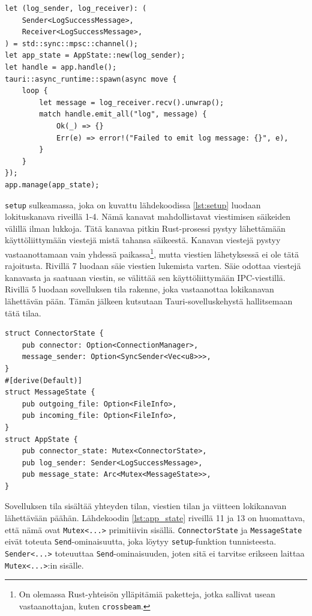 \documentclass[a4paper,12pt]{article}
\begin{document}
    \begin{lstlisting}[caption={setup-sulkeuma}, label={lst:setup}]
let (log_sender, log_receiver): (
    Sender<LogSuccessMessage>,
    Receiver<LogSuccessMessage>,
) = std::sync::mpsc::channel();
let app_state = AppState::new(log_sender);
let handle = app.handle();
tauri::async_runtime::spawn(async move {
    loop {
        let message = log_receiver.recv().unwrap();
        match handle.emit_all("log", message) {
            Ok(_) => {}
            Err(e) => error!("Failed to emit log message: {}", e),
        }
    }
});
app.manage(app_state);
\end{lstlisting}

    \lstinline{setup} sulkeamassa, joka on kuvattu lähdekoodissa \ref{lst:setup} luodaan lokituskanava riveillä 1-4. Nämä kanavat mahdollistavat viestimisen säikeiden välillä ilman lukkoja. Tätä kanavaa pitkin Rust-prosessi pystyy lähettämään käyttöliittymään viestejä mistä tahansa säikeestä. Kanavan viestejä pystyy vastaanottamaan vain yhdessä paikassa\footnote{On olemassa Rust-yhteisön ylläpitämiä paketteja, jotka sallivat usean vastaanottajan, kuten \lstinline{crossbeam}.}, mutta viestien lähetyksessä ei ole tätä rajoitusta\cite[ch. 16.2]{rust-book}. Rivillä 7 luodaan säie viestien lukemista varten. Säie odottaa viestejä kanavasta ja saatuaan viestin, se välittää sen käyttöliittymään IPC-viestillä. Rivillä 5 luodaan sovelluksen tila rakenne, joka vastaanottaa lokikanavan lähettävän pään. Tämän jälkeen kutsutaan Tauri-sovelluskehystä hallitsemaan tätä tilaa.

    \begin{lstlisting}[caption={Sovelluksen tilan rakenne}, label={lst:app_state}]
struct ConnectorState {
    pub connector: Option<ConnectionManager>,
    message_sender: Option<SyncSender<Vec<u8>>>,
}
#[derive(Default)]
struct MessageState {
    pub outgoing_file: Option<FileInfo>,
    pub incoming_file: Option<FileInfo>,
}
struct AppState {
    pub connector_state: Mutex<ConnectorState>,
    pub log_sender: Sender<LogSuccessMessage>,
    pub message_state: Arc<Mutex<MessageState>>,
}\end{lstlisting}

    Sovelluksen tila sisältää yhteyden tilan, viestien tilan ja viitteen lokikanavan lähettävään päähän. Lähdekoodin \ref{lst:app_state} riveillä 11 ja 13 on huomattava, että nämä ovat \lstinline{Mutex<...>} primitiivin sisällä. \lstinline{ConnectorState} ja \lstinline{MessageState} eivät toteuta \lstinline{Send}-ominaisuutta, joka löytyy \lstinline{setup}-funktion tunnisteesta. \lstinline{Sender<...>} toteuuttaa \lstinline{Send}-ominaisuuden, joten sitä ei tarvitse erikseen laittaa \lstinline{Mutex<...>}:in sisälle.
\end{document}

